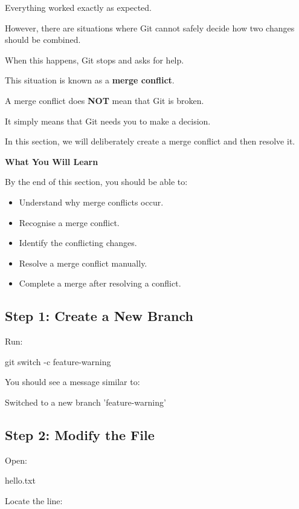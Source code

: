 \documentclass{csc2059practical}
\begin{document}
Everything worked exactly as expected.

However, there are situations where Git cannot safely decide how two changes should be combined.

When this happens, Git stops and asks for help.

This situation is known as a \textbf{merge conflict}.

A merge conflict does \textbf{NOT} mean that Git is broken.

It simply means that Git needs you to make a decision.

In this section, we will deliberately create a merge conflict and then resolve it.

\begin{learningoutcomes}
\textbf{What You Will Learn}\par
\medskip
By the end of this section, you should be able to:

\begin{itemize}
  \item Understand why merge conflicts occur.
  \item Recognise a merge conflict.
  \item Identify the conflicting changes.
  \item Resolve a merge conflict manually.
  \item Complete a merge after resolving a conflict.
\end{itemize}
\end{learningoutcomes}
\subsection{Step 1: Create a New Branch}
Run:

\begin{terminalplain}
git switch -c feature-warning
\end{terminalplain}
You should see a message similar to:

\begin{terminalplain}
Switched to a new branch 'feature-warning'
\end{terminalplain}
\subsection{Step 2: Modify the File}
Open:

\begin{terminalplain}
hello.txt
\end{terminalplain}
Locate the line:
\end{document}
